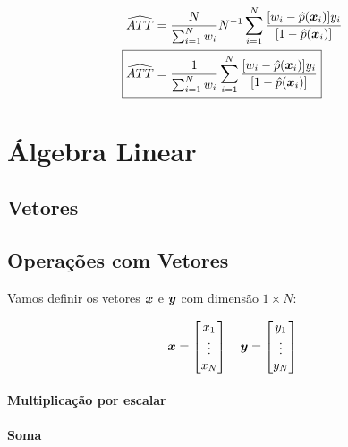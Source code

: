\documentclass[11pt, oneside, a4paper, article]{article}
\numberwithin{equation}{section}
\begin{document}
\begin{description}
\vspace{-1.5 em}
\begin{align*}
\widehat{ATT} &=
\frac{N}{\sum_{i=1}^{N} w_{i} }
N^{-1} \sum_{i=1}^{N}
\frac{[ w_{i} - \hat{p}(\xvec_{i} ) ] y_{i} }{[ 1 - \hat{p}( \xvec_{i} ) ]}
\\
\Aboxed{
\widehat{ATT} &=
\frac{1}{\sum_{i=1}^{N} w_{i} }
\sum_{i=1}^{N}
\frac{[ w_{i} - \hat{p}(\xvec_{i} ) ] y_{i} }{[1 - \hat{p}( \xvec_{i} ) ]}
}
\end{align*}

\clearpage
\section{Álgebra Linear}

\subsection{Vetores}


\subsection{Operações com Vetores}

Vamos definir os vetores $\boldsymbol{x}$ e $\boldsymbol{y}$ com dimensão $1 \times N$:

\begin{align*}
\boldsymbol{x} = 
\begin{bmatrix}
x_{1} \\ \vdots \\ x_{N}	
\end{bmatrix}
\quad
\boldsymbol{y} = 
\begin{bmatrix}
y_{1} \\ \vdots \\ y_{N}	
\end{bmatrix}
\end{align*}

\paragraph{Multiplicação por escalar}

\paragraph{Soma}


\end{description}
\end{document}
